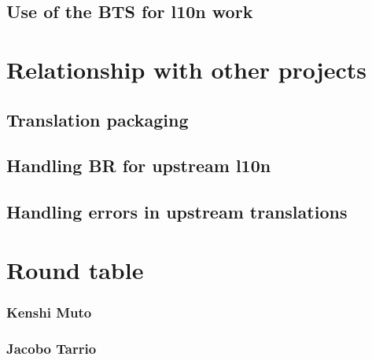 \documentclass{beamer}
\begin{document}
\begin{frame}
  \frametitle{}
\end{frame}

\begin{frame}
  \frametitle{}
\end{frame}

\begin{frame}
  \frametitle{}
\end{frame}

\subsection{Use of the BTS for l10n work}

\begin{frame}
  \frametitle{}
\end{frame}

\begin{frame}
  \frametitle{}
\end{frame}

\section{Relationship with other projects}

\subsection{Translation packaging}

\begin{frame}
  \frametitle{}
\end{frame}

\subsection{Handling BR for upstream l10n}

\begin{frame}
  \frametitle{}
\end{frame}

\subsection{Handling errors in upstream translations}

\begin{frame}
  \frametitle{}
\end{frame}

\section{Round table}

\begin{frame}
  \frametitle{Kenshi Muto}
\end{frame}

\begin{frame}
  \frametitle{Jacobo Tarrio}
\end{frame}
\end{document}
